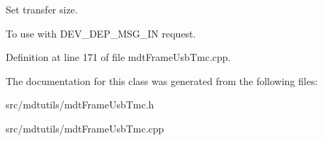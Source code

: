 Set transfer size. 

To use with DEV\_\-DEP\_\-MSG\_\-IN request. 

Definition at line 171 of file mdtFrameUsbTmc.cpp.



The documentation for this class was generated from the following files:\begin{DoxyCompactItemize}
\item 
src/mdtutils/mdtFrameUsbTmc.h\item 
src/mdtutils/mdtFrameUsbTmc.cpp\end{DoxyCompactItemize}
